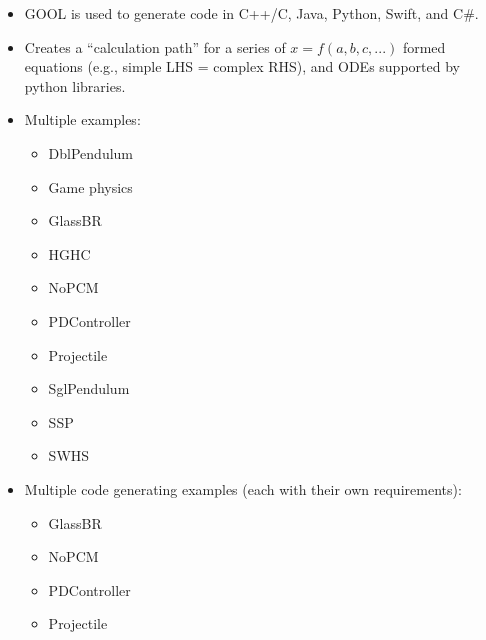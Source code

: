 \begin{itemize}
    \item GOOL is used to generate code in C++/C, Java, Python, Swift, and C\#.
    \item Creates a ``calculation path'' for a series of $x = f(a,b,c,...)$
          formed equations (e.g., simple LHS = complex RHS), and ODEs supported
          by python libraries.
    \item Multiple examples:
          \begin{itemize}
              \item DblPendulum
              \item Game physics
              \item GlassBR
              \item HGHC
              \item NoPCM
              \item PDController
              \item Projectile
              \item SglPendulum
              \item SSP
              \item SWHS
          \end{itemize}
    \item Multiple code generating examples (each with their own requirements):
          \begin{itemize}
              \item GlassBR
              \item NoPCM
              \item PDController
              \item Projectile
          \end{itemize}
\end{itemize}

